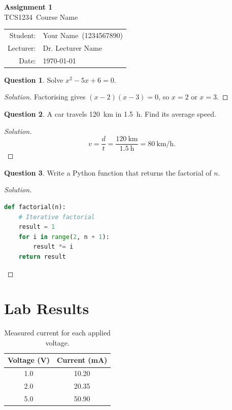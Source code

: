 \documentclass[11pt,a4paper]{article}
\newcommand{\coursecode}{TCS1234}
\newcommand{\coursename}{Course Name}
\newcommand{\assignmenttitle}{Assignment 1}
\newcommand{\studentname}{Your Name}
\newcommand{\studentid}{1234567890}
\newcommand{\lecturer}{Dr. Lecturer Name}
\theoremstyle{definition}
\newtheorem{question}{Question}
\newenvironment{solution}{\begin{proof}[Solution]}{\end{proof}}
\begin{document}
\begin{center}
  {\LARGE\bfseries \assignmenttitle}\\[0.4em]
  {\large \coursecode\ \coursename}\\[1em]
  \begin{tabular}{rl}
    Student: & \studentname\ (\studentid) \\
    Lecturer: & \lecturer \\
    Date: & \today
  \end{tabular}
\end{center}
\vspace{1em}

\begin{question}
Solve $x^2 - 5x + 6 = 0$.
\end{question}
\begin{solution}
Factorising gives $(x-2)(x-3)=0$, so $x = 2$ or $x = 3$.
\end{solution}

\begin{question}
A car travels \SI{120}{\kilo\metre} in \SI{1.5}{\hour}. Find its average speed.
\end{question}
\begin{solution}
\[
  v = \frac{d}{t} = \frac{\SI{120}{\kilo\metre}}{\SI{1.5}{\hour}} = \SI{80}{\kilo\metre\per\hour}.
\]
\end{solution}

\begin{question}
Write a Python function that returns the factorial of $n$.
\end{question}
\begin{solution}
\begin{lstlisting}[language=Python]
def factorial(n):
    # Iterative factorial
    result = 1
    for i in range(2, n + 1):
        result *= i
    return result
\end{lstlisting}
\end{solution}

\section*{Lab Results}
\begin{table}[h]
  \centering
  \begin{tabular}{S[table-format=2.1] S[table-format=3.2]}
    \toprule
    {Voltage (\si{\volt})} & {Current (\si{\milli\ampere})} \\
     & 10.20 \\
    2.0 & 20.35 \\
    5.0 & 50.90 \\
    \bottomrule
  \end{tabular}
  \caption{Measured current for each applied voltage.}
\end{table}
\end{document}
